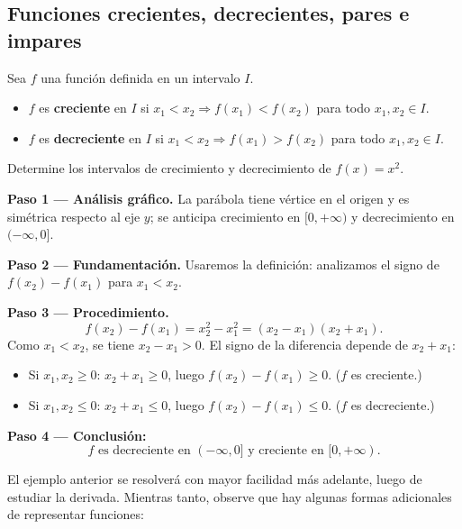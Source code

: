 \subsection{Funciones crecientes, decrecientes, pares e impares}

\begin{definition}
Sea $f$ una función definida en un intervalo $I$.
\begin{itemize}
  \item $f$ es \textbf{creciente} en $I$ si $x_1 < x_2 \Rightarrow f(x_1) < f(x_2)$ para todo $x_1, x_2 \in I$.
  \item $f$ es \textbf{decreciente} en $I$ si $x_1 < x_2 \Rightarrow f(x_1) > f(x_2)$ para todo $x_1, x_2 \in I$.
\end{itemize}
\end{definition}

\begin{example}
Determine los intervalos de crecimiento y decrecimiento de $f(x) = x^2$.

\begin{myproof}
\textbf{Paso 1 — Análisis gráfico.} La parábola tiene vértice en el origen y es simétrica respecto al eje $y$; se anticipa crecimiento en $[0,+\infty)$ y decrecimiento en $(-\infty,0]$.

\textbf{Paso 2 — Fundamentación.} Usaremos la definición: analizamos el signo de $f(x_2) - f(x_1)$ para $x_1 < x_2$.

\textbf{Paso 3 — Procedimiento.}
\[
  f(x_2) - f(x_1) = x_2^2 - x_1^2 = (x_2 - x_1)(x_2 + x_1).
\]
Como $x_1 < x_2$, se tiene $x_2 - x_1 > 0$. El signo de la diferencia depende de $x_2 + x_1$:
\begin{itemize}
  \item Si $x_1, x_2 \geq 0$: $x_2 + x_1 \geq 0$, luego $f(x_2) - f(x_1) \geq 0$. ($f$ es creciente.)
  \item Si $x_1, x_2 \leq 0$: $x_2 + x_1 \leq 0$, luego $f(x_2) - f(x_1) \leq 0$. ($f$ es decreciente.)
\end{itemize}

\textbf{Paso 4 — Conclusión:}
\[
  \boxed{f \text{ es decreciente en } (-\infty, 0] \text{ y creciente en } [0,+\infty).}
\]
\end{myproof}
\end{example}

El ejemplo anterior se resolverá con mayor facilidad más adelante, luego de estudiar la derivada. Mientras tanto, observe que hay algunas formas adicionales de representar funciones:

